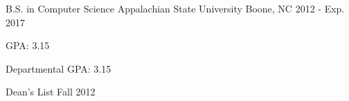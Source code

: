 \begin{cventries}
  \cventry
    {B.S. in Computer Science}
    {Appalachian State University}
    {Boone, NC}
    {2012 - Exp. 2017}
    {
      \begin{cvitems}
        \item {GPA: 3.15}
        \item {Departmental GPA: 3.15}
        \item {Dean's List Fall 2012}
      \end{cvitems}
    }
\end{cventries}
